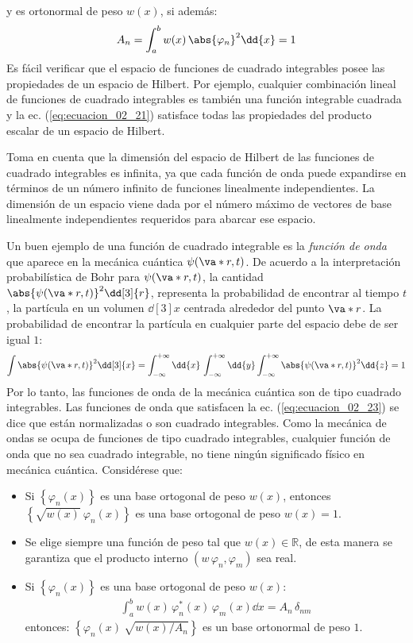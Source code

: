 y es ortonormal de peso $w(x)$, si además:
\begin{align*}
A_{n} = \int_{a}^{b} w(x) \, \abs{\varphi_{n}}^{2} \dd{x} = 1
\end{align*}
\vfill{}
Es fácil verificar que el espacio de funciones de cuadrado integrables posee las propiedades de un espacio de Hilbert. Por ejemplo, cualquier combinación lineal de funciones de cuadrado integrables es también una función integrable cuadrada y la ec. (\ref{eq:ecuacion_02_21}) satisface todas las propiedades del producto escalar de un espacio de Hilbert.
\par
Toma en cuenta que la dimensión del espacio de Hilbert de las funciones de cuadrado integrables es infinita, ya que cada función de onda puede expandirse en términos de un número infinito de funciones linealmente independientes. La dimensión de un espacio viene dada por el número máximo de vectores de base linealmente independientes requeridos para abarcar ese espacio.
\par
Un buen ejemplo de una función de cuadrado integrable es la \emph{función de onda} que aparece en la mecánica cuántica $\psi (\va*{r}, t)$. De acuerdo a la interpretación probabilística de Bohr para $\psi (\va*{r}, t)$, la cantidad $\abs{\psi (\va*{r}, t)}^{2} \dd[3]{r}$, representa la probabilidad de encontrar al tiempo $t$, la partícula en un volumen $\dd[3]{x}$ centrada alrededor del punto $\va*{r}$. La probabilidad de encontrar la partícula en cualquier parte del espacio debe de ser igual $1$:
\begin{equation}
\int \abs{\psi (\va*{r}, t)}^{2} \dd[3]{x} = \int_{-\infty}^{+\infty} \dd{x} \, \int_{-\infty}^{+\infty} \dd{y} \int_{-\infty}^{+\infty} \abs{\psi (\va*{r}, t)}^{2} \dd{z} = 1
\label{eq:ecuacion_02_23}
\end{equation}
Por lo tanto, las funciones de onda de la mecánica cuántica son de tipo cuadrado integrables. Las funciones de onda que satisfacen la ec. (\ref{eq:ecuacion_02_23}) se dice que están normalizadas o son cuadrado integrables. Como la mecánica de ondas se ocupa de funciones de tipo cuadrado integrables, cualquier función de onda que no sea cuadrado integrable, no tiene ningún significado físico en mecánica cuántica.
\vfill{}
Considérese que:
\begin{itemize}
\item Si $\left\{ \varphi_{n} (x) \right\}$ es una base ortogonal de peso $w(x)$, entonces $\left\{ \sqrt{w(x)} \: \varphi_{n} (x) \right\}$ es una base ortogonal de peso $w(x) = 1$.
\item Se elige siempre una función de peso tal que $w(x) \in \mathbb{R}$, de esta manera se garantiza que el producto interno $(w \, \varphi_{n}, \varphi_{m})$ sea real.
\item Si $\left\{ \varphi_{n} (x) \right\}$ es una base ortogonal de peso $w(x)$:
\begin{align*}
\int_{a}^{b} w(x) \,  \varphi_{n}^{*} (x) \, \varphi_{m} (x) \dd{x} = A_{n} \, \delta_{nm}
\end{align*}
entonces: $\left\{ \varphi_{n} (x) \: \sqrt{w(x) / A_{n}} \right\}$ es un base ortonormal de peso $1$.
\end{itemize}

